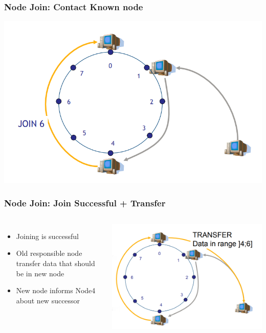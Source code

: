 \begin{frame}
    \frametitle{Node Join: Contact Known node}
    \includegraphics[scale=0.3]{figures/chord3.png}
\end{frame}

\begin{frame}
    \frametitle{Node Join: Join Successful + Transfer}
    \begin{columns}
        \begin{itemize}
            \item Joining is successful
            \item Old responsible node transfer data that should be in new node
            \item New node informs Node4 about new successor
        \end{itemize}
            \includegraphics[scale=0.26]{figures/chord4.png}
    \end{columns}
\end{frame}

